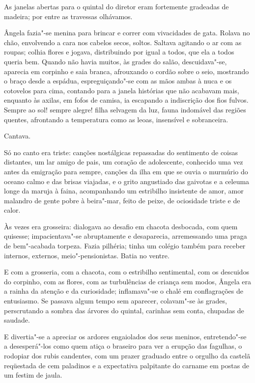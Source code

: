 As janelas abertas para o quintal do diretor eram
fortemente gradeadas de madeira; por entre as travessas olhávamos.

Ângela fazia"-se menina para brincar e correr com vivacidades de gata.
Rolava no chão, envolvendo a cara nos cabelos secos, soltos. Saltava
agitando o ar com as roupas; colhia flores e jogava, distribuindo por
igual a todos, que ela a todos queria bem. Quando não havia muitos, às
grades do salão, descuidava"-se, aparecia em corpinho e saia branca,
afrouxando o cordão sobre o seio, mostrando o braço desde a espádua,
espreguiçando"-se com as mãos ambas à nuca e os cotovelos para cima,
contando para a janela histórias que não acabavam mais, enquanto às
axilas, em fofos de camisa, ia escapando a indiscrição dos fios fulvos.
Sempre ao sol! sempre alegre! filha selvagem da luz, fauna indomável
das regiões quentes, afrontando a temperatura como as leoas, insensível
e sobranceira. 

Cantava. 

Só no canto era triste: canções nostálgicas
repassadas do sentimento de coisas distantes, um lar amigo de pais, um
coração de adolescente, conhecido uma vez antes da emigração para
sempre, canções da ilha em que se ouvia o murmúrio do oceano calmo e
das brisas viajadas, e o grito angustiado das gaivotas e a celeuma
longe da maruja à faina, acompanhando um estribilho insistente de amor,
amor malandro de gente pobre à beira"-mar, feito de peixe, de
ociosidade triste e de calor. 

Às vezes era grosseira: dialogava ao
desafio em chacota desbocada, com quem quisesse; impacientava"-se
abruptamente e desaparecia, arremessando uma praga de bem"-acabada
torpeza. Fazia pilhéria; tinha um colégio também para receber internos,
externos, meio"-pensionistas. Batia no ventre. 

E com a grosseria, com a chacota, com o estribilho sentimental,
com os descuidos do corpinho, com as flores, com as turbulências de
criança sem modos, Ângela era a rainha da atenção e da curiosidade;
inflamava"-se o chalé em conflagrações de entusiasmo. Se passava algum
tempo sem aparecer, colavam"-se às grades, perscrutando a sombra das
árvores do quintal, carinhas sem conta, chupadas de saudade. 

E divertia"-se a apreciar os ardores engaiolados dos seus meninos,
entretendo"-se a desesperá"-los como quem atiça o braseiro para ver a
erupção das fagulhas, o rodopiar dos rubis candentes, com um prazer
graduado entre o orgulho da castelã reqüestada de cem paladinos e a
expectativa palpitante do carname em postas de um festim de jaula. 

